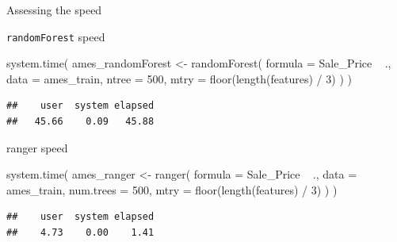 \documentclass[10pt,ignorenonframetext,]{beamer}
\newenvironment{Shaded}{}{}
\newcommand{\KeywordTok}[1]{\textcolor[rgb]{0.00,0.00,1.00}{#1}}
\newcommand{\DataTypeTok}[1]{#1}
\newcommand{\DecValTok}[1]{#1}
\newcommand{\StringTok}[1]{\textcolor[rgb]{0.00,0.50,0.50}{#1}}
\newcommand{\OperatorTok}[1]{#1}
\newcommand{\NormalTok}[1]{#1}
\begin{document}
\begin{frame}[fragile]{Assessing the speed}

\begin{block}{\texttt{randomForest} speed}

\begin{Shaded}
\begin{Highlighting}[]
\KeywordTok{system.time}\NormalTok{(}
\NormalTok{  ames_randomForest <-}\StringTok{ }\KeywordTok{randomForest}\NormalTok{(}
    \DataTypeTok{formula =}\NormalTok{ Sale_Price }\OperatorTok{~}\StringTok{ }\NormalTok{., }
    \DataTypeTok{data    =}\NormalTok{ ames_train, }
    \DataTypeTok{ntree   =} \DecValTok{500}\NormalTok{,}
    \DataTypeTok{mtry    =} \KeywordTok{floor}\NormalTok{(}\KeywordTok{length}\NormalTok{(features) }\OperatorTok{/}\StringTok{ }\DecValTok{3}\NormalTok{)}
\NormalTok{  )}
\NormalTok{)}
\end{Highlighting}
\end{Shaded}

\begin{verbatim}
##    user  system elapsed 
##   45.66    0.09   45.88
\end{verbatim}

\end{block}

\begin{block}{ranger speed}

\begin{Shaded}
\begin{Highlighting}[]
\KeywordTok{system.time}\NormalTok{(}
\NormalTok{  ames_ranger <-}\StringTok{ }\KeywordTok{ranger}\NormalTok{(}
    \DataTypeTok{formula   =}\NormalTok{ Sale_Price }\OperatorTok{~}\StringTok{ }\NormalTok{., }
    \DataTypeTok{data      =}\NormalTok{ ames_train, }
    \DataTypeTok{num.trees =} \DecValTok{500}\NormalTok{,}
    \DataTypeTok{mtry      =} \KeywordTok{floor}\NormalTok{(}\KeywordTok{length}\NormalTok{(features) }\OperatorTok{/}\StringTok{ }\DecValTok{3}\NormalTok{)}
\NormalTok{  )}
\NormalTok{)}
\end{Highlighting}
\end{Shaded}

\begin{verbatim}
##    user  system elapsed 
##    4.73    0.00    1.41
\end{verbatim}

\end{block}

\end{frame}
\end{document}
